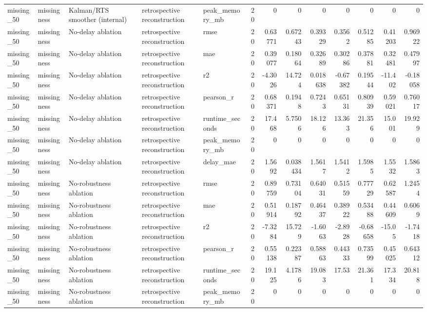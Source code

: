 \begin{table}[!htbp]
{{\begin{tabular}{lllllrrrrrrrr}
missing_50 & missingness & Kalman/RTS smoother (internal) & retrospective reconstruction & peak_memory_mb & 20 & 0 & 0 & 0 & 0 & 0 & 0 & 0 \\
missing_50 & missingness & No-delay ablation & retrospective reconstruction & rmse & 20 & 0.63771 & 0.67243 & 0.39329 & 0.3562 & 0.51285 & 0.41203 & 0.96922 \\
missing_50 & missingness & No-delay ablation & retrospective reconstruction & mae & 20 & 0.39077 & 0.18064 & 0.32689 & 0.30286 & 0.37881 & 0.32481 & 0.47997 \\
missing_50 & missingness & No-delay ablation & retrospective reconstruction & r2 & 20 & -4.3026 & 14.724 & 0.018638 & -0.67382 & 0.19544 & -11.402 & -0.18058 \\
missing_50 & missingness & No-delay ablation & retrospective reconstruction & pearson_r & 20 & 0.68371 & 0.1948 & 0.7243 & 0.65131 & 0.80939 & 0.59021 & 0.76017 \\
missing_50 & missingness & No-delay ablation & retrospective reconstruction & runtime_seconds & 20 & 17.468 & 5.7506 & 18.126 & 13.363 & 21.356 & 15.001 & 19.929 \\
missing_50 & missingness & No-delay ablation & retrospective reconstruction & peak_memory_mb & 20 & 0 & 0 & 0 & 0 & 0 & 0 & 0 \\
missing_50 & missingness & No-delay ablation & retrospective reconstruction & delay_mae & 20 & 1.5692 & 0.038434 & 1.5617 & 1.5412 & 1.5985 & 1.5532 & 1.5863 \\
missing_50 & missingness & No-robustness ablation & retrospective reconstruction & rmse & 20 & 0.89759 & 0.73104 & 0.64031 & 0.51559 & 0.77729 & 0.62587 & 1.2454 \\
missing_50 & missingness & No-robustness ablation & retrospective reconstruction & mae & 20 & 0.51914 & 0.18792 & 0.46437 & 0.38922 & 0.53488 & 0.44609 & 0.6069 \\
missing_50 & missingness & No-robustness ablation & retrospective reconstruction & r2 & 20 & -7.3284 & 15.729 & -1.6063 & -2.8928 & -0.68658 & -15.05 & -1.7418 \\
missing_50 & missingness & No-robustness ablation & retrospective reconstruction & pearson_r & 20 & 0.55138 & 0.22387 & 0.58863 & 0.44333 & 0.73599 & 0.45025 & 0.64312 \\
missing_50 & missingness & No-robustness ablation & retrospective reconstruction & runtime_seconds & 20 & 19.125 & 4.1786 & 19.083 & 17.53 & 21.361 & 17.334 & 20.818 \\
missing_50 & missingness & No-robustness ablation & retrospective reconstruction & peak_memory_mb & 20 & 0 & 0 & 0 & 0 & 0 & 0 & 0 \\

\end{tabular}}}
\end{table}
